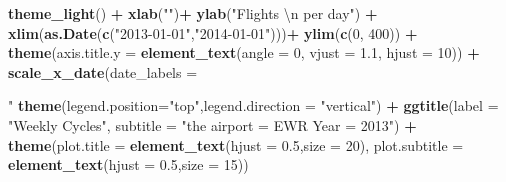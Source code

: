 \documentclass[
]{article}
\newenvironment{Shaded}{\begin{snugshade}}{\end{snugshade}}
\newcommand{\CharTok}[1]{\textcolor[rgb]{0.31,0.60,0.02}{#1}}
\newcommand{\DataTypeTok}[1]{\textcolor[rgb]{0.13,0.29,0.53}{#1}}
\newcommand{\DecValTok}[1]{\textcolor[rgb]{0.00,0.00,0.81}{#1}}
\newcommand{\FloatTok}[1]{\textcolor[rgb]{0.00,0.00,0.81}{#1}}
\newcommand{\KeywordTok}[1]{\textcolor[rgb]{0.13,0.29,0.53}{\textbf{#1}}}
\newcommand{\NormalTok}[1]{#1}
\newcommand{\OperatorTok}[1]{\textcolor[rgb]{0.81,0.36,0.00}{\textbf{#1}}}
\newcommand{\StringTok}[1]{\textcolor[rgb]{0.31,0.60,0.02}{#1}}
\begin{document}
\begin{Shaded}
\begin{Highlighting}[]
{{{{{{\StringTok{  }\KeywordTok{theme_light}\NormalTok{()  }\OperatorTok{+}
\StringTok{  }\KeywordTok{xlab}\NormalTok{(}\StringTok{""}\NormalTok{)}\OperatorTok{+}\StringTok{ }\KeywordTok{ylab}\NormalTok{(}\StringTok{"Flights  }\CharTok{\textbackslash{}n}\StringTok{ per day"}\NormalTok{) }\OperatorTok{+}
\StringTok{  }\KeywordTok{xlim}\NormalTok{(}\KeywordTok{as.Date}\NormalTok{(}\KeywordTok{c}\NormalTok{(}\StringTok{"2013-01-01"}\NormalTok{,}\StringTok{"2014-01-01"}\NormalTok{)))}\OperatorTok{+}\StringTok{  }\KeywordTok{ylim}\NormalTok{(}\KeywordTok{c}\NormalTok{(}\DecValTok{0}\NormalTok{, }\DecValTok{400}\NormalTok{)) }\OperatorTok{+}
\StringTok{  }\KeywordTok{theme}\NormalTok{(}\DataTypeTok{axis.title.y =} \KeywordTok{element_text}\NormalTok{(}\DataTypeTok{angle =} \DecValTok{0}\NormalTok{, }\DataTypeTok{vjust =} \FloatTok{1.1}\NormalTok{, }\DataTypeTok{hjust =} \DecValTok{10}\NormalTok{)) }\OperatorTok{+}
\StringTok{  }\KeywordTok{scale_x_date}\NormalTok{(}\DataTypeTok{date_labels =} \StringTok{"%d%b%Y"}\NormalTok{, }\DataTypeTok{date_breaks =} \StringTok{"1 month"}\NormalTok{,}\DataTypeTok{expand =} \KeywordTok{c}\NormalTok{(}\DecValTok{0}\NormalTok{,}\DecValTok{0}\NormalTok{)) }\OperatorTok{+}\StringTok{ }
\StringTok{  }\KeywordTok{theme}\NormalTok{(}\DataTypeTok{legend.position=}\StringTok{"top"}\NormalTok{,}\DataTypeTok{legend.direction =} \StringTok{"vertical"}\NormalTok{) }\OperatorTok{+}
\StringTok{  }\KeywordTok{ggtitle}\NormalTok{(}\DataTypeTok{label =} \StringTok{"Weekly Cycles"}\NormalTok{, }\DataTypeTok{subtitle =} \StringTok{"the airport = EWR   Year = 2013"}\NormalTok{) }\OperatorTok{+}
\StringTok{  }\KeywordTok{theme}\NormalTok{(}\DataTypeTok{plot.title =} \KeywordTok{element_text}\NormalTok{(}\DataTypeTok{hjust =} \FloatTok{0.5}\NormalTok{,}\DataTypeTok{size =} \DecValTok{20}\NormalTok{),}
        \DataTypeTok{plot.subtitle =} \KeywordTok{element_text}\NormalTok{(}\DataTypeTok{hjust =} \FloatTok{0.5}\NormalTok{,}\DataTypeTok{size =} \DecValTok{15}\NormalTok{))}

}}}}}}}
\end{Highlighting}
\end{Shaded}
\end{document}
